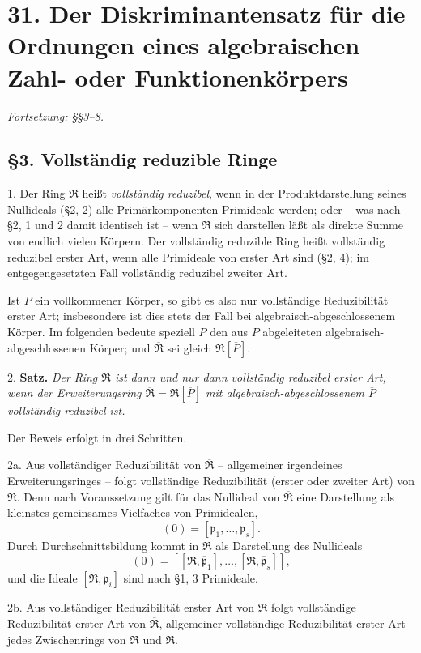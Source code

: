 \documentclass[11pt]{article}
\providecommand{\mR}{\mathfrak{R}}
\providecommand{\bR}{\overline{\mathfrak{R}}}
\providecommand{\bP}{\overline{P}}
\providecommand{\bp}{\overline{\mathfrak{p}}}
\begin{document}
\setcounter{footnote}{0}

\section*{31. Der Diskriminantensatz für die Ordnungen eines algebraischen Zahl- oder Funktionenkörpers}
\emph{Fortsetzung: §§3--8.}

\subsection*{§3. Vollständig reduzible Ringe}

1. Der Ring $\mR$ heißt \emph{vollständig reduzibel}, wenn in der Produktdarstellung seines Nullideals (§2, 2) alle Primärkomponenten Primideale werden; oder -- was nach §2, 1 und 2 damit identisch ist -- wenn $\mR$ sich darstellen läßt als direkte Summe von endlich vielen Körpern. Der vollständig reduzible Ring heißt vollständig reduzibel erster Art, wenn alle Primideale von erster Art sind (§2, 4); im entgegengesetzten Fall vollständig reduzibel zweiter Art.

Ist $P$ ein vollkommener Körper, so gibt es also nur vollständige Reduzibilität erster Art; insbesondere ist dies stets der Fall bei algebraisch-abgeschlossenem Körper. Im folgenden bedeute speziell $\bP$ den aus $P$ abgeleiteten algebraisch-abgeschlossenen Körper; und $\bR$ sei gleich $\mR[\bP]$.

2. \textbf{Satz.} \emph{Der Ring $\mR$ ist dann und nur dann vollständig reduzibel erster Art, wenn der Erweiterungsring $\bR=\mR[\bP]$ mit algebraisch-abgeschlossenem $\bP$ vollständig reduzibel ist.}

Der Beweis erfolgt in drei Schritten.

2a. Aus vollständiger Reduzibilität von $\bR$ -- allgemeiner irgendeines Erweiterungsringes -- folgt vollständige Reduzibilität (erster oder zweiter Art) von $\mR$. Denn nach Voraussetzung gilt für das Nullideal von $\bR$ eine Darstellung als kleinstes gemeinsames Vielfaches von Primidealen,
\[
        (0)=[\bp_1,\ldots,\bp_s].
\]
Durch Durchschnittsbildung kommt in $\mR$ als Darstellung des Nullideals
\[
        (0)=[[\mR,\bp_1],\ldots,[\mR,\bp_s]],
\]
und die Ideale $[\mR,\bp_i]$ sind nach §1, 3 Primideale.

2b. Aus vollständiger Reduzibilität erster Art von $\mR$ folgt vollständige Reduzibilität erster Art von $\bR$, allgemeiner vollständige Reduzibilität erster Art jedes Zwischenrings von $\mR$ und $\bR$.
\end{document}
